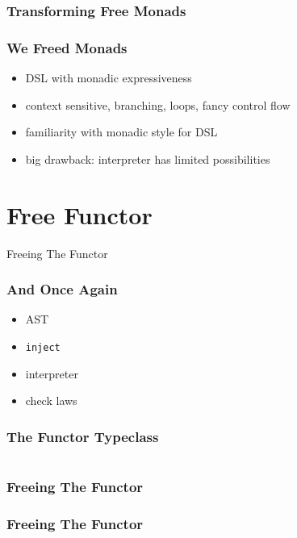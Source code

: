 \documentclass{beamer}
\newcommand{\recipe}{%
  \begin{itemize}
  \item AST
  \item \texttt{inject}
  \item interpreter
  \item check laws
  \end{itemize}
}
\begin{document}
\begin{frame}[fragile]
  \frametitle{Transforming Free Monads}
\end{frame}

\begin{frame}
  \frametitle{We Freed Monads}
  \begin{itemize}
  \item DSL with monadic expressiveness
  \item context sensitive, branching, loops, fancy control flow
  \item familiarity with monadic style for DSL
  \item big drawback: interpreter has limited possibilities
  \end{itemize}
\end{frame}

\section{Free Functor}\label{sec:free-functor}
\begin{frame}
  \begin{center}
    \Huge
    Freeing The Functor
  \end{center}
\end{frame}

\begin{frame}[fragile]
  \frametitle{And Once Again}
  \recipe{}
\end{frame}

\begin{frame}[fragile]
  \frametitle{The Functor Typeclass}
  \inputminted{scala}{snippets/functor-typeclass.scala}
\end{frame}

\begin{frame}[fragile]
  \frametitle{Freeing The Functor}
\end{frame}

\begin{frame}[fragile]
  \frametitle{Freeing The Functor}
  \inputminted{scala}{snippets/free-functor2.scala}
\end{frame}
\end{document}
